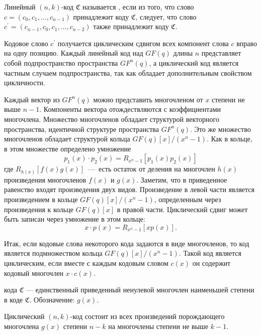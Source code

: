 \begin{definition}
Линейный $(n, k)$-код $\mathfrak{C}$ называется , если
из того, что слово $c=(c_0, c_1, \ldots, c_{n-1})$ принадлежит коду $\mathfrak{C}$,
следует, что слово $c^\prime=(c_{n-1}, c_0, c_1, \ldots, c_{n-2})$ также принадлежит
коду $\mathfrak{C}$.
\end{definition}

Кодовое слово $c^\prime$ получается циклическим сдвигом всех компонент слова $c$ вправо
на одну позицию. Каждый линейный код над $GF(q)$ длины $n$ представляет собой
подпространство пространства $GF^n(q)$, а циклический код является частным случаем
подпространства, так как обладает дополнительным свойством цикличности.

Каждый вектор из $GF^n(q)$ можно представить многочленом от $x$ степени не выше $n-1$. Компоненты вектора 
отождествляются с коэффициентами многочлена. Множество многочленов обладает структурой векторного 
пространства, идентичной структуре пространства $GF^n(q)$. Это же множество многочленов обладает структурой 
кольца $GF(q)[x]/(x^n-1)$. Как в кольце, в этом множестве определено умножение $$p_1(x)\cdot p_2(x)=R_{x^n-1} 
\left[{p_1(x)p_2(x)}\right]$$ где $R_{h(x)}\left[{f(x)g(x)}\right]$~---~есть остаток от деления на многочлен $
 h(x)$ произведения многочленов $f(x)$ и $g(x)$. Заметим, что в приведенное равенство входят произведения 
двух видов. Произведение в левой части является произведением в кольце $GF(q)[x]/(x^n-1)$, определенным через 
произведения к кольце $GF(q)[x]$ в правой части. Циклический сдвиг может быть записан через умножение в этом 
кольце: $$x\cdot p(x)=R_{x^n-1}[xp(x)].$$

Итак, если кодовые слова некоторого кода задаются в виде многочленов, то код является подмножеством
кольца $GF(q)[x]/(x^n-1)$. Такой код является циклическим, если вместе с каждым кодовым словом $c(x)$
он содержит кодовый многочлен $x\cdot c(x)$.

\begin{definition}
 кода $\mathfrak{C}$ --- единственный приведенный ненулевой многочлен наименьшей степени в коде $\mathfrak{C}$. Обозначение: $g(x)$.
\end{definition}

\begin{theorem} 
Циклический $(n, k)$-код состоит из всех произведений порождающего многочлена $g(x)$ степени $n-k$ на многочлены степени не выше $k-1$.
\end{theorem}

